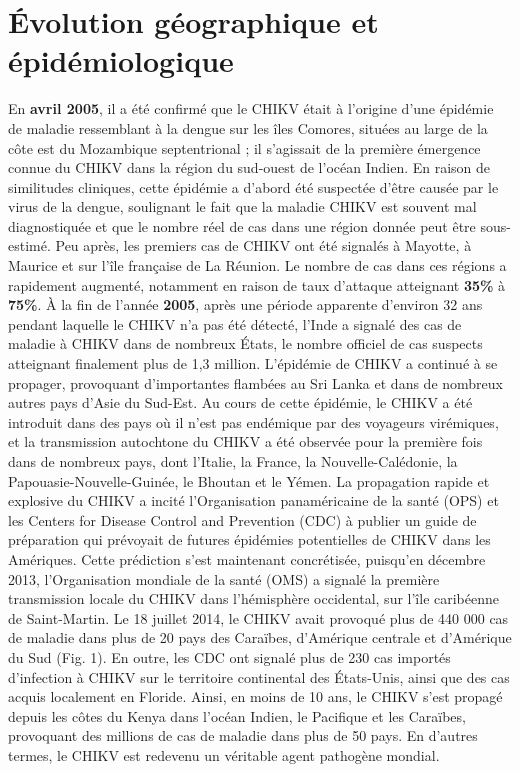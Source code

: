 \section*{Évolution géographique et épidémiologique}
En \textbf{avril 2005}, il a été confirmé que le CHIKV était à l'origine d'une épidémie de maladie ressemblant à la dengue sur les îles Comores, situées au large de la côte est du Mozambique septentrional ; il s'agissait de la première émergence connue du CHIKV dans la région du sud-ouest de l'océan Indien. En raison de similitudes cliniques, cette épidémie a d'abord été suspectée d'être causée par le virus de la dengue, soulignant le fait que la maladie CHIKV est souvent mal diagnostiquée et que le nombre réel de cas dans une région donnée peut être sous-estimé. Peu après, les premiers cas de CHIKV ont été signalés à Mayotte, à Maurice et sur l'île française de La Réunion. Le nombre de cas dans ces régions a rapidement augmenté, notamment en raison de taux d'attaque atteignant \textbf{35\%} à \textbf{75\%}. À la fin de l'année \textbf{2005}, après une période apparente d'environ 32 ans pendant laquelle le CHIKV n'a pas été détecté, l'Inde a signalé des cas de maladie à CHIKV dans de nombreux États, le nombre officiel de cas suspects atteignant finalement plus de 1,3 million. L'épidémie de CHIKV a continué à se propager, provoquant d'importantes flambées au Sri Lanka et dans de nombreux autres pays d'Asie du Sud-Est. Au cours de cette épidémie, le CHIKV a été introduit dans des pays où il n'est pas endémique par des voyageurs virémiques, et la transmission autochtone du CHIKV a été observée pour la première fois dans de nombreux pays, dont l'Italie, la France, la Nouvelle-Calédonie, la Papouasie-Nouvelle-Guinée, le Bhoutan et le Yémen. La propagation rapide et explosive du CHIKV a incité l'Organisation panaméricaine de la santé (OPS) et les Centers for Disease Control and Prevention (CDC) à publier un guide de préparation qui prévoyait de futures épidémies potentielles de CHIKV dans les Amériques. Cette prédiction s'est maintenant concrétisée, puisqu'en décembre 2013, l'Organisation mondiale de la santé (OMS) a signalé la première transmission locale du CHIKV dans l'hémisphère occidental, sur l'île caribéenne de Saint-Martin. Le 18 juillet 2014, le CHIKV avait provoqué plus de 440 000 cas de maladie dans plus de 20 pays des Caraïbes, d'Amérique centrale et d'Amérique du Sud (Fig. 1). En outre, les CDC ont signalé plus de 230 cas importés d'infection à CHIKV sur le territoire continental des États-Unis, ainsi que des cas acquis localement en Floride. Ainsi, en moins de 10 ans, le CHIKV s'est propagé depuis les côtes du Kenya dans l'océan Indien, le Pacifique et les Caraïbes, provoquant des millions de cas de maladie dans plus de 50 pays. En d'autres termes, le CHIKV est redevenu un véritable agent pathogène mondial.
